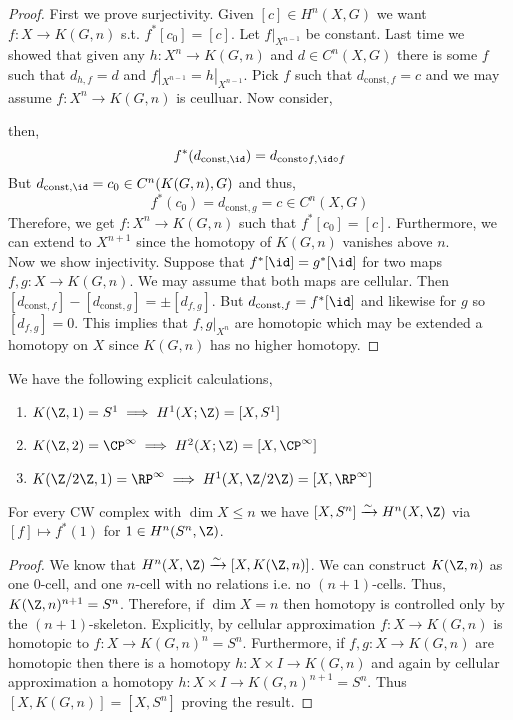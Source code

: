 \documentclass[12pt]{extarticle}
\begin{document}
\begin{proof}
First we prove surjectivity. Given $[c] \in H^n(X, G)$ we want $f : X \to K(G, n)$ s.t. $f^*[c_0] = [c]$. Let $f |_{X^{n-1}}$ be constant. Last time we showed that given any $h : X^n \to K(G, n)$ and $d \in C^n(X, G)$ there is some $f$ such that $d_{h, f} = d$ and $f|_{X^{n-1}} = h|_{X^{n-1}}$. Pick $f$ such that $d_{\text{const}, f} = c$ and we may assume $f : X^n \to K(G, n)$ is ceulluar.  Now consider,
\begin{center}
\end{center}
then,
\[ f^*(d_{\text{const}, \id}) = d_{\text{const} \circ f, \id \circ f} \]
But $d_{\text{const}, \id} = c_0 \in C^n(K(G, n), G)$ and thus,
\[ f^*(c_0) = d_{\text{const}, g} = c \in C^n(X, G) \]
Therefore, we get $f : X^n \to K(G, n)$ such that $f^* [c_0] = [c]$. Furthermore, we can extend to $X^{n+1}$ since the homotopy of $K(G, n)$ vanishes above $n$. 
\bigskip\\
Now we show injectivity. Suppose that $f^*[\id] = g^*[\id]$ for two maps $f, g : X \to K(G, n)$. We may assume that both maps are cellular. Then $[d_{\text{const}, f} ] - [d_{\text{const}, g}] = \pm [d_{f,g}]$. But $d_{\text{const}, f} = f^*[\id]$ and likewise for $g$ so $[d_{f,g}] = 0$. This implies that $f, g |_{X^n}$ are homotopic which may be extended a homotopy on $X$ since $K(G, n)$ has no higher homotopy. 
\end{proof}

\begin{ex}
We have the following explicit calculations,
\begin{enumerate}
\item $K(\Z, 1) = S^1 \implies H^1(X; \Z) = [X, S^1]$
\item $K(\Z, 2) = \CP^\infty \implies H^2(X; \Z) = [X, \CP^\infty]$
\item $K(\Z/2 \Z, 1) = \RP^\infty \implies H^1(X, \Z / 2 \Z) = [X, \RP^\infty]$
\end{enumerate}
\end{ex}

\begin{thm}[Hopf]
For every CW complex with $\dim{X} \le n$ we have $[X, S^n] \xrightarrow{\sim} H^n(X, \Z)$ via $[f] \mapsto f^*(1)$ for $1 \in H^n(S^n, \Z)$. 
\end{thm}

\begin{proof}
We know that $H^n(X, \Z) \xrightarrow{\sim} [X, K(\Z, n)]$. We can construct $K(\Z, n)$ as one $0$-cell, and one $n$-cell with no relations i.e. no $(n+1)$-cells. Thus, $K(\Z, n)^{n+1} = S^n$. Therefore, if $\dim{X} = n$ then homotopy is controlled only by the $(n+1)$-skeleton. Explicitly, by cellular approximation $f : X \to K(G, n)$ is homotopic to $f : X \to K(G, n)^{n} = S^n$. Furthermore, if $f, g : X \to K(G, n)$ are homotopic then there is a homotopy $h : X \times I \to K(G, n)$ and again by cellular approximation a homotopy $h : X \times I \to K(G, n)^{n+1} = S^n$. Thus $[X, K(G, n)] = [X, S^n]$ proving the result. 
\end{proof}
\end{document}
